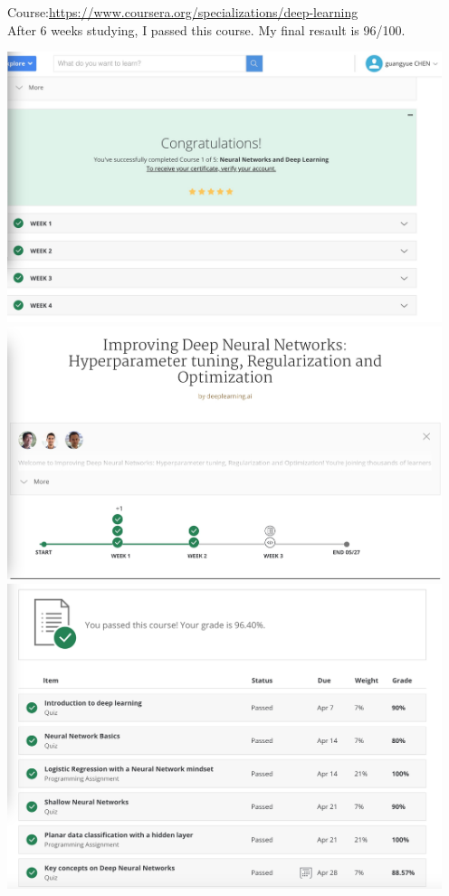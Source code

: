 \documentclass[a4paper]{article}
\begin{document}
Course:\href{https://www.coursera.org/specializations/deep-learning}{https://www.coursera.org/specializations/deep-learning} \\
After 6 weeks studying, I passed this course. My final resault is 96/100.
\begin{center}
\includegraphics[width=5in]{res1.jpeg}
\includegraphics[width=5in]{res2.jpeg}
\includegraphics[width=5in]{res3.jpeg}
\end{center}
\end{document}

